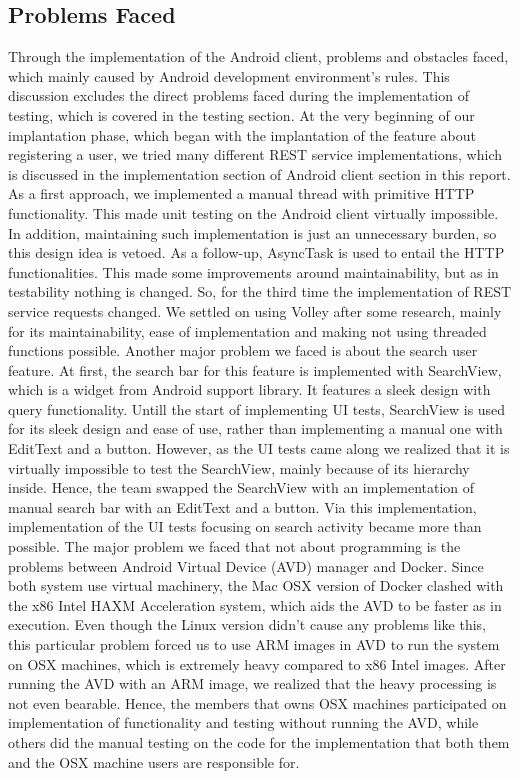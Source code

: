 \documentclass[11pt,a4paper]{report}
\begin{document}
\subsection{Problems Faced}
Through the implementation of the Android client, problems and obstacles faced, which mainly caused by Android development environment’s rules. This discussion excludes the direct problems faced during the implementation of testing, which is covered in the testing section.
At the very beginning of our implantation phase, which began with the implantation of the feature about registering a user, we tried many different REST service implementations, which is discussed in the implementation section of Android client section in this report. As a first approach, we implemented a manual thread with primitive HTTP functionality. This made unit testing on the Android client virtually impossible. In addition, maintaining such implementation is just an unnecessary burden, so this design idea is vetoed. As a follow-up, AsyncTask is used to entail the HTTP functionalities. This made some improvements around maintainability, but as in testability nothing is changed. So, for the third time the implementation of REST service requests changed. We settled on using Volley after some research, mainly for its maintainability, ease of implementation and making not using threaded functions possible.
Another major problem we faced is about the search user feature. At first, the search bar for this feature is implemented with SearchView, which is a widget from Android support library. It features a sleek design with query functionality. Untill the start of implementing UI tests, SearchView is used for its sleek design and ease of use, rather than implementing a manual one with EditText and a button. However, as the UI tests came along we realized that it is virtually impossible to test the SearchView, mainly because of its hierarchy inside. Hence, the team swapped the SearchView with an implementation of manual search bar with an EditText and a button. Via this implementation, implementation of the UI tests focusing on search activity became more than possible.
The major problem we faced that not about programming is the problems between Android Virtual Device (AVD) manager and Docker. Since both system use virtual machinery, the Mac OSX version of Docker clashed with the x86 Intel HAXM Acceleration system, which aids the AVD to be faster as in execution. Even though the Linux version didn’t cause any problems like this, this particular problem forced us to use ARM images in AVD to run the system on OSX machines, which is extremely heavy compared to x86 Intel images. After running the AVD with an ARM image, we realized that the heavy processing is not even bearable. Hence, the members that owns OSX machines participated on implementation of functionality and testing without running the AVD, while others did the manual testing on the code for the implementation that both them and the OSX machine users are responsible for.
\end{document}
